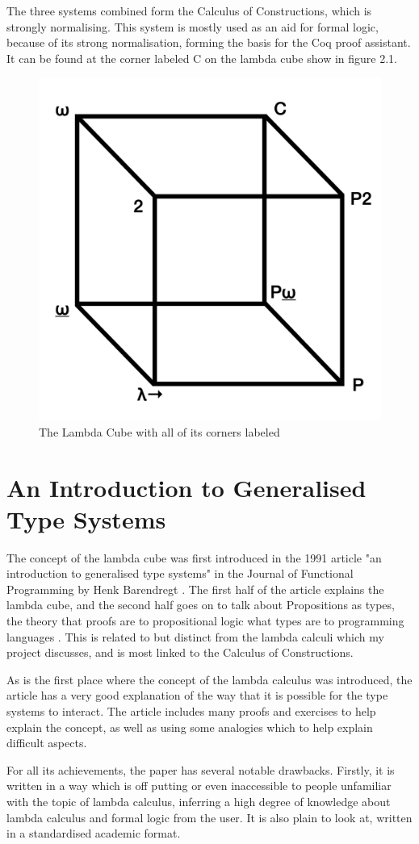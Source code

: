 \documentclass{l4proj}
\begin{document}
The three systems combined form the Calculus of Constructions, which is strongly normalising.  This system is mostly used as an aid for formal logic, because of its strong normalisation, forming the basis for the Coq proof assistant.  It can be found at the corner labeled C on the lambda cube show in figure 2.1.

\begin{figure}[h!]
    \centering
    \includegraphics[width=0.5\linewidth]{dissertation/images/cube.png}
    \caption{The Lambda Cube with all of its corners labeled}
    \label{fig:enter-label}
\end{figure}

\section{An Introduction to Generalised Type Systems}
The concept of the lambda cube was first introduced in the 1991 article "an introduction to generalised type systems" in the Journal of Functional Programming by Henk Barendregt \citep{barendregt_introduction_1991}.  The first half of the article explains the lambda cube, and the second half goes on to talk about Propositions as types, the theory that proofs are to propositional logic what types are to programming languages \citep{props_as_types}.  This is related to but distinct from the lambda calculi which my project discusses, and is most linked to the Calculus of Constructions.

As is the first place where the concept of the lambda calculus was introduced, the article has a very good explanation of the way that it is possible for the type systems to interact.  The article includes many proofs and exercises to help explain the concept, as well as using some analogies which to help explain difficult aspects.

For all its achievements, the paper has several notable drawbacks.  Firstly, it is written in a way which is off putting or even inaccessible to people unfamiliar with the topic of lambda calculus, inferring a high degree of knowledge about lambda calculus and formal logic from the user.  It is also plain to look at, written in a standardised academic format.
\end{document}
